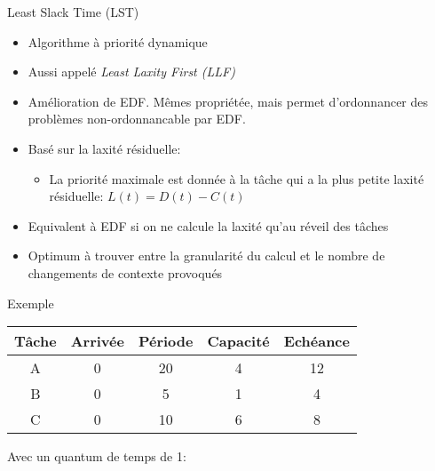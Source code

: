 \begin{frame}{Least Slack Time (LST)} 
  \begin{itemize}
  \item Algorithme à priorité dynamique
  \item Aussi appelé \emph{Least Laxity First (LLF)}
  \item   Amélioration   de  EDF.   Mêmes   propriétée,  mais   permet
    d'ordonnancer des problèmes non-ordonnancable par EDF.
  \item Basé sur la laxité résiduelle: 
    \begin{itemize}
    \item La  priorité maximale est  donnée à la  tâche qui a  la plus
      petite laxité résiduelle: $L(t) = D(t) - C(t)$
    \end{itemize}
  \item Equivalent à  EDF si on ne calcule la  laxité qu'au réveil des
    tâches
  \item Optimum à trouver entre  la granularité du calcul et le nombre
    de changements de  contexte provoqués 
  \end{itemize}
\end{frame}

\begin{frame}{Exemple}
  \begin{center}
    \begin{tabular}{ccccc}
      \hline
      Tâche & Arrivée & Période & Capacité & Echéance \\
      \hline
      A & 0 & 20 & 4 & 12\\
      B & 0 &  5 & 1 & 4\\
      C & 0 & 10 & 6 & 8\\
      \hline
    \end{tabular}
  \end{center}
  Avec un quantum de temps de 1:
\end{frame} 

